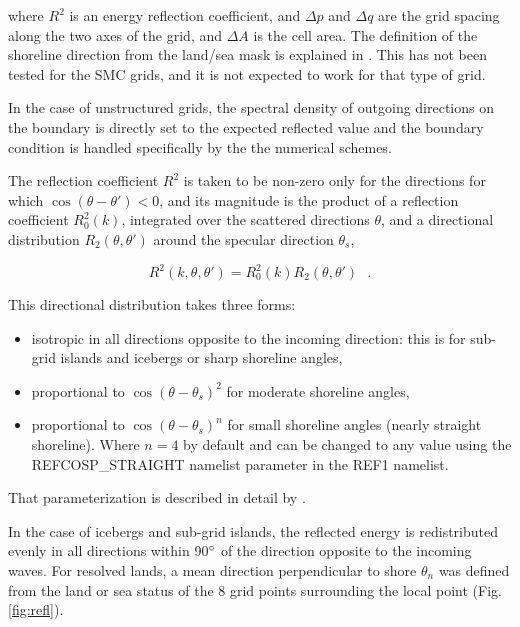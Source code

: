 \noindent
where $R^2$ is an energy reflection coefficient, and $\Delta p$ and $\Delta q$
are the grid spacing along the two axes of the grid, and $\Delta A$ is the
cell area. The definition of the shoreline direction from the land/sea mask is
explained in \cite{art:Aea11}. This has not been tested for the SMC grids, and
it is not expected to work for that type of grid.

In the case of unstructured grids, the spectral density of outgoing directions
on the boundary is directly set to the expected reflected value and the
boundary condition is handled specifically by the the numerical schemes.


The reflection coefficient $R^2$ is taken to be non-zero only for the
directions for which $\cos(\theta-\theta')<0$, and its magnitude is the
product of a reflection coefficient $R_0^2(k)$, integrated over the scattered
directions $\theta$, and a directional distribution $R_2(\theta,\theta')$
around the specular direction $\theta_s$,

\begin{equation} 
R^2(k,\theta,\theta')  =  R_0^2(k) R_2(\theta,\theta') \:\:\: .
\end{equation}

\noindent
This directional distribution takes three forms: 
\begin{itemize}

\item isotropic in all directions opposite to the incoming direction: this is
      for sub-grid islands and icebergs or sharp shoreline angles, 

\item proportional to $\cos(\theta-\theta_s)^2$ for moderate shoreline angles,

\item proportional to $\cos(\theta-\theta_s)^n$ for small shoreline angles
      (nearly straight shoreline). Where $n=4$ by default and can be changed
      to any value using the {\code REFCOSP\_STRAIGHT} namelist parameter in
      the {\F REF1} namelist.

\end{itemize}

\noindent
That parameterization is described in detail by \cite{art:AR12}.

In the case of icebergs and sub-grid islands, the reflected energy is
redistributed evenly in all directions within 90$^\circ$ of the direction
opposite to the incoming waves.  For resolved lands, a mean direction
perpendicular to shore $\theta_n$ was defined from the land or sea status of
the 8 grid points surrounding the local point (Fig. \ref{fig:refl}).

